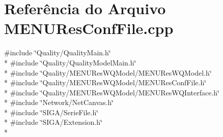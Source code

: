 \section{Referência do Arquivo M\+E\+N\+U\+Res\+Conf\+File.\+cpp}
\label{_m_e_n_u_res_conf_file_8cpp}
{\ttfamily \#include \char`\"{}Quality/\+Quality\+Main.\+h\char`\"{}}\\*
{\ttfamily \#include \char`\"{}Quality/\+Quality\+Model\+Main.\+h\char`\"{}}\\*
{\ttfamily \#include \char`\"{}Quality/\+M\+E\+N\+U\+Res\+W\+Q\+Model/\+M\+E\+N\+U\+Res\+W\+Q\+Model.\+h\char`\"{}}\\*
{\ttfamily \#include \char`\"{}Quality/\+M\+E\+N\+U\+Res\+W\+Q\+Model/\+M\+E\+N\+U\+Res\+Conf\+File.\+h\char`\"{}}\\*
{\ttfamily \#include \char`\"{}Quality/\+M\+E\+N\+U\+Res\+W\+Q\+Model/\+M\+E\+N\+U\+Res\+W\+Q\+Interface.\+h\char`\"{}}\\*
{\ttfamily \#include \char`\"{}Network/\+Net\+Canvas.\+h\char`\"{}}\\*
{\ttfamily \#include \char`\"{}S\+I\+G\+A/\+Serie\+File.\+h\char`\"{}}\\*
{\ttfamily \#include \char`\"{}S\+I\+G\+A/\+Extension.\+h\char`\"{}}\\*
